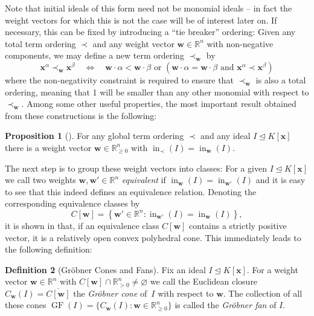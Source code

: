 \documentclass[
  paper=a4,
  titlepage,
  bibliography=totoc,
  pagesize=pdftex
]{scrartcl}
\numberwithin{figure}{section}
\numberwithin{equation}{section}
\numberwithin{table}{section}
\newcommand*\setR{\mathds{R}}
\let\vec\mathbf
\let\idealof\trianglelefteq
\DeclareMathOperator{\initial}{in}
\DeclareMathOperator{\GF}{GF}
\theoremstyle{definition}
\newtheorem{definition}{Definition}
\newtheorem{proposition}[definition]{Proposition}
\numberwithin{definition}{section}
\begin{document}
Note that initial ideals of this form need not be monomial ideals -- in fact the weight
vectors for which this is not the case will be of interest later on. If necessary, this
can be fixed by introducing a \enquote{tie breaker} ordering: Given any total term
ordering $\prec$ and any weight vector $\vec w\in\setR^n$ with non-negative components, we
may define a new term ordering $\prec_{\vec w}$ by
\[
  \vec x^\alpha \prec_{\vec w} \vec x^\beta
  \quad\iff\quad
  \vec w \cdot \alpha < \vec w\cdot \beta
  \text{ or }
  \left(
    \vec w \cdot \alpha = \vec w\cdot \beta
    \text{ and }
    \vec x^\alpha \prec \vec x^\beta
  \right)
\]
where the non-negativity constraint is required to ensure that $\prec_{\vec w}$ is also a
total ordering, meaning that 1 will be smaller than any other monomial with respect to
$\prec_{\vec w}$. Among some other useful properties, the most important result obtained
from these constructions is the following:

\begin{proposition}[{\cite[Proposition~1.11]{SturmGBCP}}]
  \label{prp:init}
  For any global term ordering $\prec$ and any ideal $I \idealof K[\vec x]$ there is a
  weight vector $\vec w \in \setR^n_{\geq0}$ with $\initial_\prec(I) = \initial_{\vec
  w}(I)$.
\end{proposition}

The next step is to group these weight vectors into classes: For a given $I \idealof
K[\vec x]$ we call two weights $\vec w, \vec w' \in \setR^n$ \emph{equivalent} if
$\initial_{\vec w}(I) = \initial_{\vec w'}(I)$ and it is easy to see that this indeed
defines an equivalence relation. Denoting the corresponding equivalence classes by
\[
  C[\vec w] = \left\{
    \vec w' \in \setR^n : \initial_{\vec w'}(I) = \initial_{\vec w}(I)
  \right\},
\]
it is shown in \cite[Section~2]{compGrobFan} that, if an equivalence class $C[\vec w]$
contains a strictly positive vector, it is a relatively open convex polyhedral cone. This
immediately leads to the following definition:

\begin{definition}[Gröbner Cones and Fans]
  \label{def:groebnerConeFan}
  Fix an ideal $I \idealof K[\vec x]$. For a weight vector $\vec w \in \setR^n$ with
  $C[\vec w] \cap \setR^n_{>0} \neq \varnothing$ we call the Euclidean closure $C_{\vec
  w}(I) = \overline{C[\vec w]}$ the \emph{Gröbner cone} of~$I$ with respect to $\vec w$.
  The collection of all these cones $\GF(I) = \{ C_{\vec w}(I) : \vec w \in
  \setR^n_{\geq0} \}$ is called the \emph{Gröbner fan} of $I$.
\end{definition}
\end{document}
